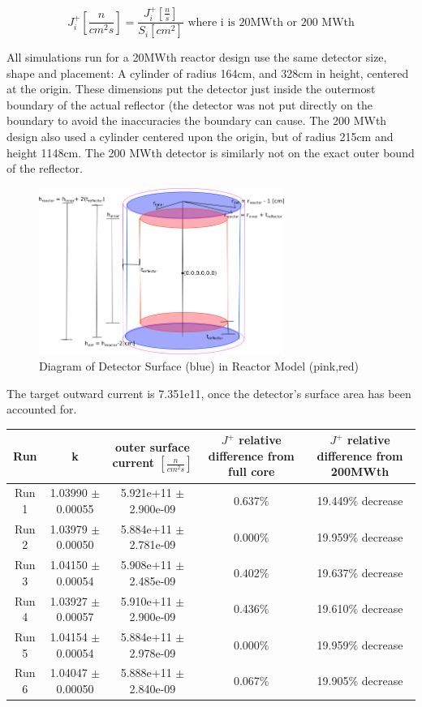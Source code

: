 \documentclass[letterpaper]{article}
\begin{document}
\[ J^+_{i} [\frac{n}{cm^2s}] = \frac{J^+_{i} [\frac{n}{s}]}{S_{i} [cm^2]} \text{ where i is 20MWth or 200 MWth} \]

All simulations run for a 20MWth reactor design use the same detector size, shape and placement:  A cylinder of radius 164cm, and 328cm in height, centered at the origin.  These dimensions put the detector just inside the outermost boundary of the actual reflector (the detector was not put directly on the boundary to avoid the inaccuracies the boundary can cause.  The 200 MWth design also used a cylinder centered upon the origin, but of radius 215cm and height 1148cm.  The 200 MWth detector is similarly not on the exact outer bound of the reflector.

\begin{figure}[H]
\centerline{\includegraphics[width=8cm,keepaspectratio]{detector-layout.png}}
\caption{Diagram of Detector Surface (blue) in Reactor Model (pink,red)}
\label{top}
\end{figure}


The target outward current is 7.351e11, once the detector's surface area has been accounted for.

\begin{adjustbox}{max width=\textwidth}
\centering
 \begin{tabular}{|c | c | c | c | c|}
 	\hline \hline
 	Run & k & outer surface current $[\frac{n}{cm^2s}]$ & $J^+$ relative difference from full core & $J^+$ relative difference from 200MWth \\
 	\hline\hline
 	Run 1 & 1.03990 $\pm$ 0.00055 & 5.921e+11 $\pm$ 2.900e-09 & 0.637$\%$ & 19.449$\%$ decrease \\
 	Run 2 & 1.03979 $\pm$ 0.00050 & 5.884e+11 $\pm$ 2.781e-09 & 0.000$\%$ & 19.959$\%$ decrease \\
 	Run 3 & 1.04150 $\pm$ 0.00054 & 5.908e+11 $\pm$ 2.485e-09 & 0.402$\%$ & 19.637$\%$ decrease \\
 	Run 4 & 1.03927 $\pm$ 0.00057 & 5.910e+11 $\pm$ 2.900e-09 & 0.436$\%$ & 19.610$\%$ decrease \\
 	Run 5 & 1.04154 $\pm$ 0.00054 & 5.884e+11 $\pm$ 2.978e-09 & 0.000$\%$ & 19.959$\%$ decrease \\
 	Run 6 & 1.04047 $\pm$ 0.00050 & 5.888e+11 $\pm$ 2.840e-09 & 0.067$\%$ & 19.905$\%$ decrease \\
 	\hline


 \end{tabular}
\end{adjustbox}
\end{document}
